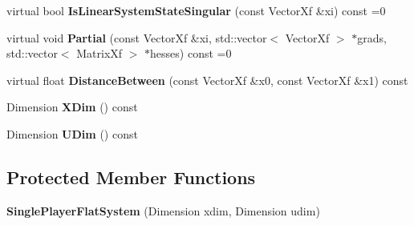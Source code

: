 \begin{DoxyCompactItemize}
\item 
virtual bool {\bfseries Is\+Linear\+System\+State\+Singular} (const Vector\+Xf \&xi) const =0\hypertarget{classilqgames_1_1_single_player_flat_system_a7c4f5712a49f29f7e2e5b0bebc645f87}{}\label{classilqgames_1_1_single_player_flat_system_a7c4f5712a49f29f7e2e5b0bebc645f87}

\item 
virtual void {\bfseries Partial} (const Vector\+Xf \&xi, std\+::vector$<$ Vector\+Xf $>$ $\ast$grads, std\+::vector$<$ Matrix\+Xf $>$ $\ast$hesses) const =0\hypertarget{classilqgames_1_1_single_player_flat_system_ac13f3f047b18f757fa0237b79024c22a}{}\label{classilqgames_1_1_single_player_flat_system_ac13f3f047b18f757fa0237b79024c22a}

\item 
virtual float {\bfseries Distance\+Between} (const Vector\+Xf \&x0, const Vector\+Xf \&x1) const \hypertarget{classilqgames_1_1_single_player_flat_system_a887a8c265b40218d02efaf876e6a8843}{}\label{classilqgames_1_1_single_player_flat_system_a887a8c265b40218d02efaf876e6a8843}

\item 
Dimension {\bfseries X\+Dim} () const \hypertarget{classilqgames_1_1_single_player_flat_system_ada9537087ddb5460fed6eff12e6b280b}{}\label{classilqgames_1_1_single_player_flat_system_ada9537087ddb5460fed6eff12e6b280b}

\item 
Dimension {\bfseries U\+Dim} () const \hypertarget{classilqgames_1_1_single_player_flat_system_a47c268e369f91c0b9609af7949c085bb}{}\label{classilqgames_1_1_single_player_flat_system_a47c268e369f91c0b9609af7949c085bb}

\end{DoxyCompactItemize}
\subsection*{Protected Member Functions}
\begin{DoxyCompactItemize}
\item 
{\bfseries Single\+Player\+Flat\+System} (Dimension xdim, Dimension udim)\hypertarget{classilqgames_1_1_single_player_flat_system_a4ab18a6147857ce85583ea41c1959a54}{}\label{classilqgames_1_1_single_player_flat_system_a4ab18a6147857ce85583ea41c1959a54}

\end{DoxyCompactItemize}
